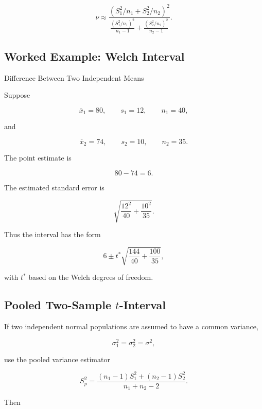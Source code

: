 \[
\boxed{
\nu
\approx
\frac{
\left(
S_1^2/n_1
+
S_2^2/n_2
\right)^2
}{
\frac{
(S_1^2/n_1)^2
}{
n_1-1
}
+
\frac{
(S_2^2/n_2)^2
}{
n_2-1
}
}.
}
\]

\subsection{Worked Example: Welch Interval}
\label{subsec:worked-welch-ci}

\begin{workedexamplebox}{Difference Between Two Independent Means}

Suppose

\[
\overline{x}_1=80,
\qquad
s_1=12,
\qquad
n_1=40,
\]

and

\[
\overline{x}_2=74,
\qquad
s_2=10,
\qquad
n_2=35.
\]

The point estimate is

\[
80-74=6.
\]

The estimated standard error is

\[
\sqrt{
\frac{12^2}{40}
+
\frac{10^2}{35}
}.
\]

Thus the interval has the form

\begin{answerbox}
\[
\boxed{
6
\pm
t^*
\sqrt{
\frac{144}{40}
+
\frac{100}{35}
},
}
\]

with \(t^*\) based on the Welch degrees of freedom.
\end{answerbox}

\end{workedexamplebox}

\subsection{Pooled Two-Sample \(t\)-Interval}
\label{subsec:pooled-two-sample-ci}

If two independent normal populations are assumed to have a common
variance,

\[
\sigma_1^2
=
\sigma_2^2
=
\sigma^2,
\]

use the pooled variance estimator

\[
\boxed{
S_p^2
=
\frac{
(n_1-1)S_1^2
+
(n_2-1)S_2^2
}{
n_1+n_2-2
}.
}
\]

Then

